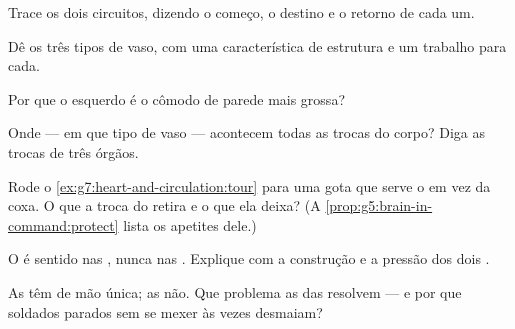 \begin{exercise}[$\star$]\label{exo:g7:heart-and-circulation:3}
Trace os dois circuitos, dizendo o começo, o destino e o retorno de
cada um.
\end{exercise}

\begin{exercise}[$\star$]\label{exo:g7:heart-and-circulation:4}
Dê os três tipos de vaso, com uma característica de estrutura e um
trabalho para cada.
\end{exercise}

\begin{exercise}[$\star$]\label{exo:g7:heart-and-circulation:5}
Por que o  esquerdo é o cômodo de parede mais grossa?
\end{exercise}

\begin{exercise}[$\star$]\label{exo:g7:heart-and-circulation:6}
Onde --- em que tipo de vaso --- acontecem todas as trocas do corpo?
Diga as trocas  de três órgãos.
\end{exercise}

\begin{exercise}[$\star\star$]\label{exo:g7:heart-and-circulation:7}
Rode o \cref{ex:g7:heart-and-circulation:tour} para uma gota que serve
o  em vez da coxa. O que a troca  do  retira e o
que ela deixa? (A \cref{prop:g5:brain-in-command:protect} lista os
apetites dele.)
\end{exercise}

\begin{exercise}[$\star\star$]\label{exo:g7:heart-and-circulation:8}
O  é sentido nas , nunca nas . Explique com a
construção e a pressão dos dois .
\end{exercise}

\begin{exercise}[$\star\star$]\label{exo:g7:heart-and-circulation:9}
As  têm  de mão única; as  não. Que problema as
 das  resolvem --- e por que soldados parados sem se mexer
às vezes desmaiam?
\end{exercise}

